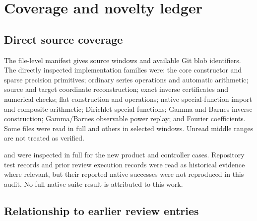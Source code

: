 \section{Coverage and novelty ledger}

\subsection{Direct source coverage}

The file-level manifest gives source windows and available Git blob identifiers. The directly inspected implementation families were: the core constructor and sparse precision primitives; ordinary series operations and automatic arithmetic; source and target coordinate reconstruction; exact inverse certificates and numerical checks; flat construction and operations; native special-function import and composite arithmetic; Dirichlet special functions; Gamma and Barnes inverse construction; Gamma/Barnes observable power replay; and Fourier coefficients. Some files were read in full and others in selected windows. Unread middle ranges are not treated as verified.

 and  were inspected in full for the new product and controller cases. Repository test records and prior review execution records were read as historical evidence where relevant, but their reported native successes were not reproduced in this audit. No full native suite result is attributed to this work.

\subsection{Relationship to earlier review entries}

